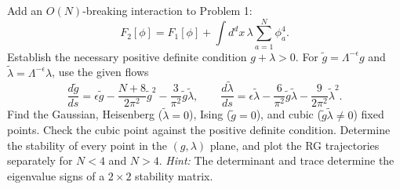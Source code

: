 Add an $O(N)$-breaking interaction to Problem 1:
\begin{equation}
    F_2[\phi]=F_1[\phi]
    +\int d^dx\,\lambda\sum_{a=1}^N\phi_a^4.
\end{equation}
Establish the necessary positive definite condition $g+\lambda>0$.
For $\tilde g=\Lambda^{-\epsilon}g$ and
$\tilde\lambda=\Lambda^{-\epsilon}\lambda$, use the given flows
\begin{equation}
    \frac{d\tilde g}{ds}=\epsilon\tilde g
    -\frac{N+8}{2\pi^2}\tilde g^{2}
    -\frac3{\pi^2}\tilde g\tilde\lambda,
    \qquad
    \frac{d\tilde\lambda}{ds}=\epsilon\tilde\lambda
    -\frac6{\pi^2}\tilde g\tilde\lambda
    -\frac9{2\pi^2}\tilde\lambda^{2}.
\end{equation}
Find the Gaussian, Heisenberg ($\tilde\lambda=0$), Ising
($\tilde g=0$), and cubic ($\tilde g\tilde\lambda\ne0$)
fixed points. Check the cubic point against the positive definite condition.
Determine the stability of every point in the $(g,\lambda)$ plane,
and plot the RG trajectories separately for $N<4$ and $N>4$.
\textit{Hint:} The determinant and trace determine the eigenvalue signs
of a $2\times2$ stability matrix.
